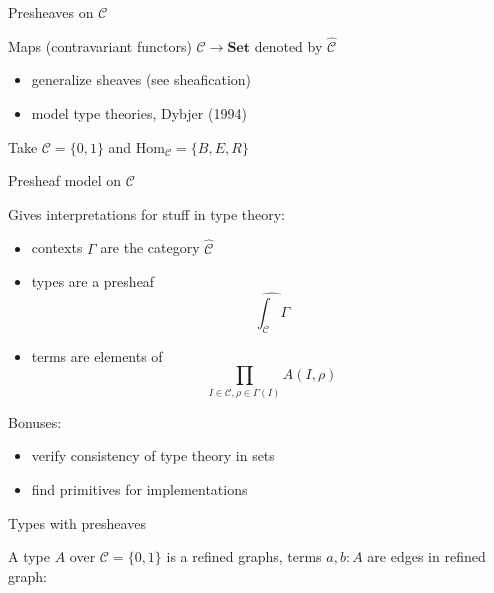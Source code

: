 \documentclass[english]{beamer}
\begin{document}
\begin{frame}{Presheaves on $\mathcal{C}$}
 
 Maps (contravariant functors) $\mathcal{C} \rightarrow \mathbf{Set}$ denoted by $\hat{\mathcal{C}}$
 
 \begin{itemize}
 \item generalize sheaves (see sheafication)
 \item model type theories, Dybjer (1994)
 \end{itemize}
 
 \begin{example}    
 Take $\mathcal{C} = \{0,1\}$ and $\text{Hom}_{\mathcal{C}}= \{B,E,R\}$
 
     
 
 
 
\end{example} 

 
\end{frame}

\begin{frame}{Presheaf model on $\mathcal{C}$}
 
 Gives interpretations for stuff in type theory:
 \begin{itemize}
  \item contexts $\Gamma$ are the category $\widehat{\mathcal{C}}$
  \item types are a presheaf $$\widehat{\int_{\mathcal{C}} \Gamma}$$
  \item terms are elements of $$\prod _{I \in \mathcal{C}, \rho \in \Gamma (I)} A(I,\rho)$$
 \end{itemize}

 \pause
 
 Bonuses:
 
 \begin{itemize}
  \item verify consistency of type theory in sets
  \item find primitives for implementations
 \end{itemize}
 
\end{frame}

\begin{frame}{Types with presheaves}

  \begin{example}
  A type $A$  over $\mathcal{C} = \{0,1\}$ is a refined graphs,   
  terms $a,b:A$ are edges in refined graph:
  \begin{figure}\label{depgraphdiag}
\begin{center} 
  
\end{center}    
  \end{figure}
 \end{example}
\end{frame}
\end{document}
